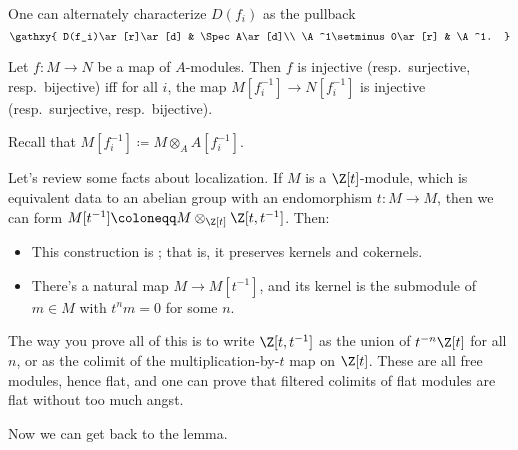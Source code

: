 One can alternately characterize $D(f_i)$ as the pullback
\begin{equation}
\gathxy{
	D(f_i)\ar[r]\ar[d] & \Spec A\ar[d]\\
	\A^1\setminus 0\ar[r] & \A^1.
}
\end{equation}
\begin{lem}
\label{injsurjloc}
Let $f\colon M\to N$ be a map of $A$-modules. Then $f$ is injective (resp.\ surjective, resp.\ bijective) iff for
all $i$, the map $M[f_i^{-1}]\to N[f_i^{-1}]$ is injective (resp.\ surjective, resp.\ bijective).
\end{lem}
Recall that $M[f_i^{-1}]\coloneqq M\otimes_A A[f_i^{-1}]$.
\begin{rem}
\label{locrem}
Let's review some facts about localization. If $M$ is a $\Z[t]$-module, which is equivalent data to an abelian
group with an endomorphism $t\colon M\to M$, then we can form $M[t^{-1}]\coloneqq M\otimes_{\Z[t]} \Z[t, t^{-1}]$.
Then:
\begin{itemize}
	\item This construction is ; that is, it preserves kernels and cokernels.
	\item There's a natural map $M\to M[t^{-1}]$, and its kernel is the submodule of $m\in M$ with $t^nm = 0$ for
	some $n$.
\end{itemize}
The way you prove all of this is to write $\Z[t, t^{-1}]$ as the union of $t^{-n}\Z[t]$ for all $n$, or as the
colimit of the multiplication-by-$t$ map on $\Z[t]$. These are all free modules, hence flat, and one can prove that
filtered colimits of flat modules are flat without too much angst.
\end{rem}
Now we can get back to the lemma.

